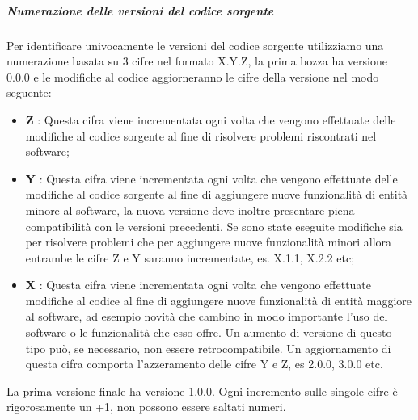 		\subparagraph*{Numerazione delle versioni del codice sorgente}
		Per identificare univocamente le versioni del codice sorgente utilizziamo una numerazione basata su 3 cifre nel formato X.Y.Z, la prima bozza ha versione 0.0.0 e le modifiche al codice aggiorneranno le cifre della versione nel modo seguente:
		\begin{itemize}
			\item \textbf{Z} : Questa cifra viene incrementata ogni volta che vengono effettuate delle modifiche al codice sorgente al fine di risolvere problemi riscontrati nel software;
			\item \textbf{Y} : Questa cifra viene incrementata ogni volta che vengono effettuate delle modifiche al codice sorgente al fine di aggiungere nuove funzionalità di entità minore al software, la nuova versione deve inoltre presentare piena compatibilità con le versioni precedenti. Se sono state eseguite modifiche sia per risolvere problemi che per aggiungere nuove funzionalità minori allora entrambe le cifre Z e Y saranno incrementate, es. X.1.1, X.2.2 etc;
			\item \textbf{X} : Questa cifra viene incrementata ogni volta che vengono effettuate modifiche al codice al fine di aggiungere nuove funzionalità di entità maggiore al software, ad esempio novità che cambino in modo importante l'uso del software o le funzionalità che esso offre. Un aumento di versione di questo tipo può, se necessario, non essere retrocompatibile. Un aggiornamento di questa cifra comporta l'azzeramento delle cifre Y e Z, es 2.0.0, 3.0.0 etc.
		\end{itemize}
		La prima versione finale ha versione 1.0.0.
		\newline
		Ogni incremento sulle singole cifre è rigorosamente un +1, non possono essere saltati numeri.
		
